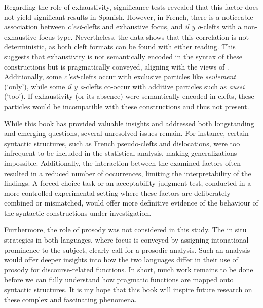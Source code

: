 Regarding the role of exhaustivity, significance tests revealed that this factor does not yield significant results in Spanish. However, in French, there is a noticeable association between \textit{c'est}-clefts and exhaustive focus, and \textit{il y a}-clefts with a non-exhaustive focus type. Nevertheless, the data shows that this correlation is not deterministic, as both cleft formats can be found with either reading. This suggests that exhaustivity is not semantically encoded in the syntax of these constructions but is pragmatically conveyed, aligning with the views of \textcite{horn1981exhaustiveness, dufter2009clefting, karssenberg2017oiseaux, destruel2018interpretation}. Additionally, some \textit{c'est}-clefts occur with exclusive particles like \textit{seulement} (`only'), while some \textit{il y a}-clefts co-occur with additive particles such as \textit{aussi} (`too'). If exhaustivity (or its absence) were semantically encoded in clefts, these particles would be incompatible with these constructions and thus not present.

While this book has provided valuable insights and addressed both longstanding and emerging questions, several unresolved issues remain. For instance, certain syntactic structures, such as French pseudo-clefts and dislocations, were too infrequent to be included in the statistical analysis, making generalizations impossible. Additionally, the interaction between the examined factors often resulted in a reduced number of occurrences, limiting the interpretability of the findings. A forced-choice task or an acceptability judgment test, conducted in a more controlled experimental setting where these factors are deliberately combined or mismatched, would offer more definitive evidence of the behaviour of the syntactic constructions under investigation.

Furthermore, the role of prosody was not considered in this study. The in situ strategies in both languages, where focus is conveyed by assigning intonational prominence to the subject, clearly call for a prosodic analysis. Such an analysis would offer deeper insights into how the two languages differ in their use of prosody for discourse-related functions.
In short, much work remains to be done before we can fully understand how pragmatic functions are mapped onto syntactic structures. It is my hope that this book will inspire future research on these complex and fascinating phenomena.
